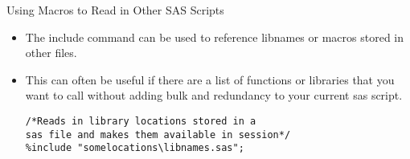 \documentclass{beamer}
\begin{document}
\begin{frame}[fragile]{Using Macros to Read in Other SAS Scripts}
\begin{itemize}
\item The include command can be used to reference libnames or macros stored in other files.
\item This can often be useful if there are a list of functions or libraries that you want to call without adding bulk and redundancy to your current sas script.
\begin{verbatim}
/*Reads in library locations stored in a 
sas file and makes them available in session*/
%include "somelocations\libnames.sas";
\end{verbatim}
\end{itemize}
\end{frame}
\end{document}
